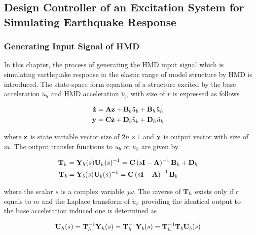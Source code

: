 \subsection{Design Controller of an Excitation System for Simulating Earthquake Response}
\subsubsection{Generating Input Signal of HMD}\label{sec:7-5-1}
In this chapter, the process of generating the HMD input signal which is simulating earthquake response in the elastic range of model structure by HMD is introduced. The state-space form equation of a structure excited by the base acceleration $\ddot{u}_{b}$ and HMD acceleration $\ddot{u}_{h}$ with size of $r$ is expressed as follows

\begin{equation}\label{eq:7-11}
\begin{aligned}
\mathbf{\dot{z}}&= \mathbf{A}\mathbf{z} + \mathbf{B}_{b}\ddot{u}_{b}+\mathbf{B}_{h}\ddot{u}_{h}\\
\mathbf{y}&=\mathbf{C}\mathbf{z}+\mathbf{D}_{b}\ddot{u}_{b}+\mathbf{D}_{h}\ddot{u}_{h}
\end{aligned}
\end{equation}

where $\mathbf{z}$ is state variable vector size of $2n\times1$ and $\mathbf{y}$ is output vector with size of $m$. The output transfer functions to $\ddot{u}_{b}$ or $\ddot{u}_{h}$ are given by

\begin{equation}\label{eq:7-12}
\begin{aligned}
\mathbf{T}_{h}&=\mathbf{Y}_{h}(s)\mathbf{U}_{h}(s)^{-1} = \mathbf{C}\left(s\mathbf{I}-\mathbf{A}\right)^{-1}\mathbf{B}_{h} + \mathbf{D}_{h}\\
\mathbf{T}_{b}&=\mathbf{Y}_{b}(s)\mathbf{U}_{b}(s)^{-1} = \mathbf{C}\left(s\mathbf{I}-\mathbf{A}\right)^{-1}\mathbf{B}_{b}
\end{aligned}
\end{equation}

where the scalar $s$ is a complex variable $j\omega$. The inverse of $\mathbf{T}_{h}$ exists only if $r$ equals to $m$ and the Laplace transform of $\ddot{u}_{h}$ providing the identical output to the base acceleration induced one is determined as

\begin{equation}\label{eq:7-13}
\mathbf{U}_{h}(s) = \mathbf{T}_{h}^{-1}\mathbf{Y}_{h}(s) = \mathbf{T}_{h}^{-1}\mathbf{Y}_{b}(s) = \mathbf{T}_{h}^{-1}\mathbf{T}_{b}\mathbf{U}_{b}(s)
\end{equation}

